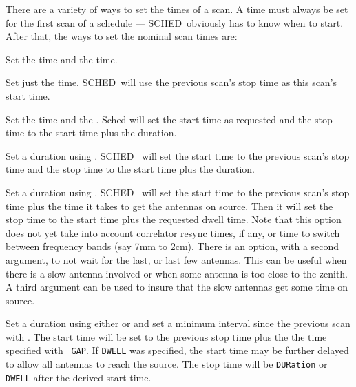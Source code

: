 \documentclass{report}
\newcommand{\schedb}{{\sc SCHED~}}
\begin{document}
There are a variety of ways to set the times of a scan.  A  time must always be set for the first scan of a
schedule --- \schedb obviously has to know when to start.  After that,
the ways to set the nominal scan times are:

\begin{list}{}{\parsep 0em  \itemsep 0em }

\item Set the  time and the
 time.

\item Set just the  time.  \schedb will
use the previous scan's stop time as this scan's start time.

\item Set the  time and the
.  Sched will set the start time as
requested and the stop time to the start time plus the duration.

\item Set a duration using .  \schedb
will set the start time to the previous scan's stop time and the
stop time to the start time plus the duration.

\item Set a duration using .  \schedb
will set the start time to the previous scan's stop time plus the time
it takes to get the antennas on source.  Then it will set the stop
time to the start time plus the requested dwell time.  Note that this
option does not yet take into account correlator resync times, if any,
or time to switch between frequency bands (say 7mm to 2cm).  There is
an option, with a second argument, to not wait for the last, or last
few antennas.  This can be useful when there is a slow antenna
involved or when some antenna is too close to the zenith.  A third
argument can be used to insure that the slow antennas get some time
on source.

\item Set a duration using either  or
 and set a minimum interval since the
previous scan with .  The start time will
be set to the previous stop time plus the the time specified with {\tt
GAP}.  If {\tt DWELL} was specified, the start time may be further
delayed to allow all antennas to reach the source.  The stop time
will be {\tt DURation} or {\tt DWELL} after the derived start time.


\end{list}
\end{document}
